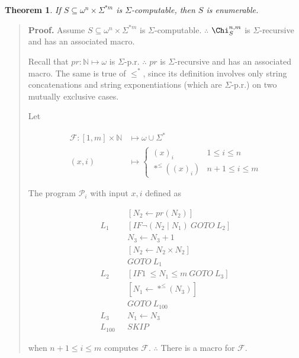 \documentclass[a4paper, 12pt]{article}
\newtheorem{theorem}{Theorem}
\newtheorem{theorem}{Theorem}
\begin{document}
\begin{theorem}
    If $S \subseteq \omega^{n} \times \Sigma^{*m} $ is $\Sigma$-computable, then
    $S$ is enumerable.
\end{theorem}


\small
\begin{quote}

\textbf{Proof.} Assume $S \subseteq \omega^{n} \times \Sigma^{*m} $ is
$\Sigma$-computable. $\therefore $ $\Chi_{S}^{n, m}$ is $\Sigma$-recursive and
has an associated macro.

Recall that $pr : \mathbb{N} \mapsto \omega$ is
$\Sigma$-p.r. $\therefore $ $pr$ is $\Sigma$-recursive and has an associated
macro. The same is true of $\leq^{*}$, since its definition involves only string
concatenations and string exponentiations (which are $\Sigma$-p.r.) on two
mutually exclusive cases. 

Let

\begin{align*}
    \mathcal{F} : [1, m]  \times \mathbb{N} &\mapsto \omega \cup \Sigma^{*}  \\ 
    (x, i) &\mapsto \begin{cases}
        (x)_i & 1 \leq i \leq n \\
        *^{\leq} \left( (x)_i \right) & n + 1 \leq i \leq m
    \end{cases}
\end{align*}

The program $\mathcal{P}_i$ with input $x, i$ defined as

\begin{align*}
   &[N_2 \leftarrow pr(N_2)] \\
    L_1 ~ ~ ~ &[IF \neg (N_2 \mid N_1) ~ GOTO ~ L_2] \\
              & N_3 \leftarrow N_3 + 1 \\ 
              & [N_2 \leftarrow N_2 \times N_2] \\ 
              & GOTO ~ L_1 \\ 
    L_2 ~ ~ ~ & [IF 1~ \leq N_1 \leq m ~ GOTO ~ L_{3}]\\
    & [N_1 \leftarrow *^{\leq}(N_3)] \\ 
              &GOTO ~ L_{100} \\
    L_3 ~ ~ ~ & N_1 \leftarrow N_3 \\ 
    L_{100} ~ ~ ~ & SKIP
\end{align*}

when $n + 1 \leq i \leq m$ computes $\mathcal{F}$. $\therefore $ There is a
macro for $\mathcal{F}$.


\end{quote}
\end{document}
